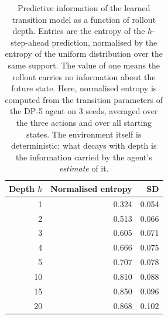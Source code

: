 \begin{table}[ht]
\centering
\small
\caption{Predictive information of the learned transition model as a function of rollout depth. Entries are the entropy of the $h$-step-ahead prediction, normalised by the entropy of the uniform distribution over the same support. The value of one means the rollout carries no information about the future state. Here, normalised entropy is computed from the transition parameters of the DP-5 agent on 3 seeds, averaged over the three actions and over all starting states. The environment itself is deterministic; what decays with depth is the information carried by the agent's \textit{estimate} of it.}
\label{tab:planningdepth}
\begin{tabular}{rrr}
\toprule
Depth $h$ & Normalised entropy & SD \\
\midrule
1 & 0.324 & 0.054 \\
2 & 0.513 & 0.066 \\
3 & 0.605 & 0.071 \\
4 & 0.666 & 0.075 \\
5 & 0.707 & 0.078 \\
10 & 0.810 & 0.088 \\
15 & 0.850 & 0.096 \\
20 & 0.868 & 0.102 \\
\bottomrule
\end{tabular}
\end{table}
